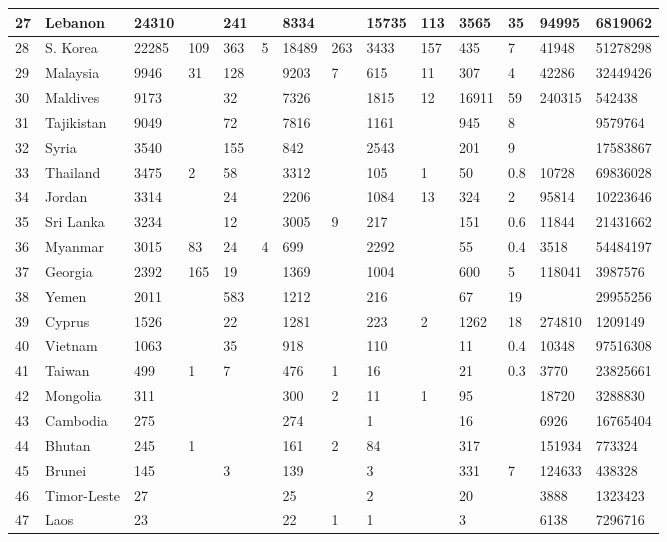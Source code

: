 \begin{landscape}
\begin{footnotesize}
\begin{longtable}{ | l | l | l | l | l | l | l | l | l | l | l | l | l | l | }
	27 & Lebanon & 24310 &  & 241 &  & 8334 &  & 15735 & 113 & 3565 & 35 & 94995 & 6819062 \\ \hline
	28 & S. Korea & 22285 & 109 & 363 & 5 & 18489 & 263 & 3433 & 157 & 435 & 7 & 41948 & 51278298 \\ \hline
	29 & Malaysia & 9946 & 31 & 128 &  & 9203 & 7 & 615 & 11 & 307 & 4 & 42286 & 32449426 \\ \hline
	30 & Maldives & 9173 &  & 32 &  & 7326 &  & 1815 & 12 & 16911 & 59 & 240315 & 542438 \\ \hline
	31 & Tajikistan & 9049 &  & 72 &  & 7816 &  & 1161 &  & 945 & 8 &  & 9579764 \\ \hline
	32 & Syria & 3540 &  & 155 &  & 842 &  & 2543 &  & 201 & 9 &  & 17583867 \\ \hline
	33 & Thailand & 3475 & 2 & 58 &  & 3312 &  & 105 & 1 & 50 & 0.8 & 10728 & 69836028 \\ \hline
	34 & Jordan & 3314 &  & 24 &  & 2206 &  & 1084 & 13 & 324 & 2 & 95814 & 10223646 \\ \hline
	35 & Sri Lanka & 3234 &  & 12 &  & 3005 & 9 & 217 &  & 151 & 0.6 & 11844 & 21431662 \\ \hline
	36 & Myanmar & 3015 & 83 & 24 & 4 & 699 &  & 2292 &  & 55 & 0.4 & 3518 & 54484197 \\ \hline
	37 & Georgia & 2392 & 165 & 19 &  & 1369 &  & 1004 &  & 600 & 5 & 118041 & 3987576 \\ \hline
	38 & Yemen & 2011 &  & 583 &  & 1212 &  & 216 &  & 67 & 19 &  & 29955256 \\ \hline
	39 & Cyprus & 1526 &  & 22 &  & 1281 &  & 223 & 2 & 1262 & 18 & 274810 & 1209149 \\ \hline
	40 & Vietnam & 1063 &  & 35 &  & 918 &  & 110 &  & 11 & 0.4 & 10348 & 97516308 \\ \hline
	41 & Taiwan & 499 & 1 & 7 &  & 476 & 1 & 16 &  & 21 & 0.3 & 3770 & 23825661 \\ \hline
	42 & Mongolia & 311 &  &  &  & 300 & 2 & 11 & 1 & 95 &  & 18720 & 3288830 \\ \hline
	43 & Cambodia & 275 &  &  &  & 274 &  & 1 &  & 16 &  & 6926 & 16765404 \\ \hline
	44 & Bhutan & 245 & 1 &  &  & 161 & 2 & 84 &  & 317 &  & 151934 & 773324 \\ \hline
	45 & Brunei & 145 &  & 3 &  & 139 &  & 3 &  & 331 & 7 & 124633 & 438328 \\ \hline
	46 & Timor-Leste & 27 &  &  &  & 25 &  & 2 &  & 20 &  & 3888 & 1323423 \\ \hline
	47 & Laos & 23 &  &  &  & 22 & 1 & 1 &  & 3 &  & 6138 & 7296716 \\ \hline
\end{longtable}
\end{footnotesize}
\end{landscape}


